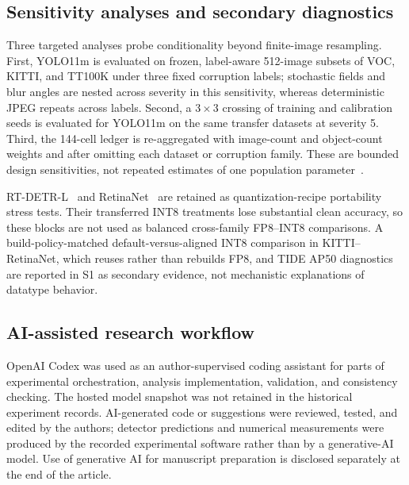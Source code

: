 \documentclass[a4paper,fleqn]{cas-dc}
\begin{document}
\subsection{Sensitivity analyses and secondary diagnostics}
\label{sec:sensitivities}
\label{sec:crossfamily-methods}
\label{sec:attachment-method}

Three targeted analyses probe conditionality beyond finite-image resampling. First, YOLO11m is evaluated on frozen, label-aware 512-image subsets of VOC, KITTI, and TT100K under three fixed corruption labels; stochastic fields and blur angles are nested across severity in this sensitivity, whereas deterministic JPEG repeats across labels. Second, a $3\times3$ crossing of training and calibration seeds is evaluated for YOLO11m on the same transfer datasets at severity 5. Third, the 144-cell ledger is re-aggregated with image-count and object-count weights and after omitting each dataset or corruption family. These are bounded design sensitivities, not repeated estimates of one population parameter~\citep{bouthillier2021variance}.

RT-DETR-L~\citep{carion2020detr,zhao2024rtdetr} and RetinaNet~\citep{lin2017focal,torchvision2026retinanet} are retained as quantization-recipe portability stress tests. Their transferred INT8 treatments lose substantial clean accuracy, so these blocks are not used as balanced cross-family FP8--INT8 comparisons. A build-policy-matched default-versus-aligned INT8 comparison in KITTI--RetinaNet, which reuses rather than rebuilds FP8, and TIDE AP50 diagnostics~\citep{bolya2020tide} are reported in S1 as secondary evidence, not mechanistic explanations of datatype behavior.

\subsection{AI-assisted research workflow}

OpenAI Codex was used as an author-supervised coding assistant for parts of experimental orchestration, analysis implementation, validation, and consistency checking. The hosted model snapshot was not retained in the historical experiment records. AI-generated code or suggestions were reviewed, tested, and edited by the authors; detector predictions and numerical measurements were produced by the recorded experimental software rather than by a generative-AI model. Use of generative AI for manuscript preparation is disclosed separately at the end of the article.
\end{document}
